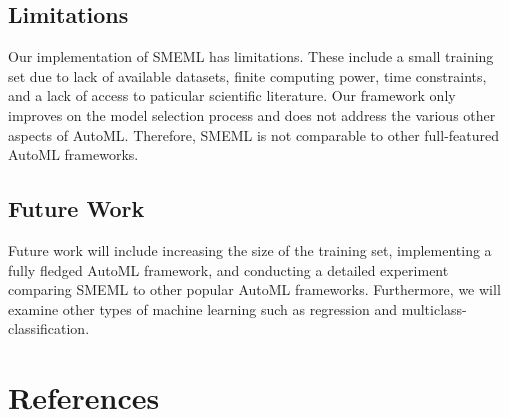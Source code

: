 \documentclass{article}
\begin{document}
\subsection{Limitations}
Our implementation of SMEML has limitations. These include a small training set due to lack of available datasets, finite computing power, time constraints, and a lack of access to paticular scientific literature. Our framework only improves on the model selection process and does not address the various other aspects of AutoML. Therefore, SMEML is not comparable to other full-featured AutoML frameworks.
\subsection{Future Work}
Future work will include increasing the size of the training set, implementing a fully fledged AutoML framework, and conducting a detailed experiment comparing SMEML to other popular AutoML frameworks. Furthermore, we will examine other types of machine learning such as regression and multiclass-classification.

\section*{References}
\end{document}
